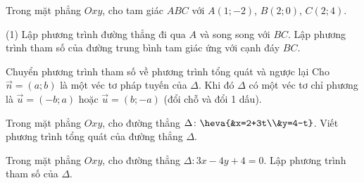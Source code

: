 \begin{vd}
	Trong mặt phẳng $Oxy$, cho tam giác $ABC$ với $A(1;-2)$, $B(2;0)$, $C(2;4)$. 
	\begin{tasks}(1)
		\task Lập phương trình đường thẳng đi qua $A$ và song song với $BC$.
		\task Lập phương trình tham số của đường trung bình tam giác ứng với cạnh đáy $ BC$.
	\end{tasks}
	\loigiai{
	}
\end{vd}

\begin{dang}{Chuyển phương trình tham số về phương trình tổng quát và ngược lại}
	 Cho $\vec{n}=(a;b)$ là một véc tơ pháp tuyến của $\Delta$. Khi đó $\Delta$ có một véc tơ chỉ phương là $\vec{u}=(-b;a)$ hoặc $\vec{u}=(b;-a)$ (đổi chỗ và đổi 1 dấu).
\end{dang}

\begin{vd}
	Trong mặt phẳng $Oxy$, cho đường thẳng $\Delta \colon \heva{&x=2+3t\\&y=4-t}$. Viết phương trình tổng quát của đường thẳng $\Delta$.
\end{vd}

\begin{vd}
	Trong mặt phẳng $Oxy$, cho đường thẳng $\Delta \colon 3x - 4y + 4=0$. Lập phương trình tham số của $\Delta$.
\end{vd}

